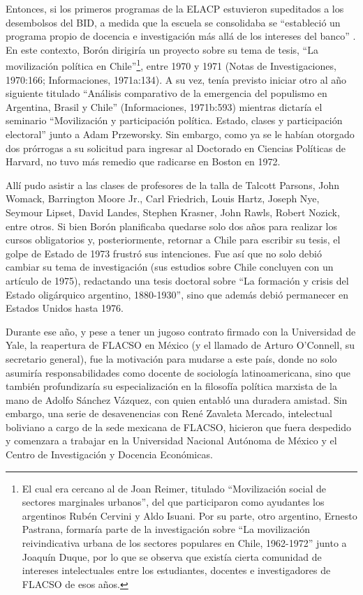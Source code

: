 Entonces, si los primeros programas de la ELACP estuvieron supeditados a los desembolsos del BID, a medida que la escuela se consolidaba se \enquote{estableció un programa propio de docencia e investigación más allá de los intereses del banco} \parencite[83]{1515-ABARZUACUTRONI2014}. En este contexto, Borón dirigiría un proyecto sobre su tema de tesis, \enquote{La movilización política en Chile}\footnote{El cual era cercano al de Joan Reimer, titulado \enquote{Movilización social de sectores marginales urbanos}, del que participaron como ayudantes los argentinos Rubén Cervini y Aldo Isuani. Por su parte, otro argentino, Ernesto Pastrana, formaría parte de la investigación sobre \enquote{La movilización reivindicativa urbana de los sectores populares en Chile, 1962-1972} junto a Joaquín Duque, por lo que se observa que existía cierta comunidad de intereses intelectuales entre los estudiantes, docentes e investigadores de FLACSO de esos años.}, entre 1970 y 1971 (Notas de Investigaciones, 1970:166; Informaciones, 1971a:134). A su vez, tenía previsto iniciar otro al año siguiente titulado \enquote{Análisis comparativo de la emergencia del populismo en Argentina, Brasil y Chile} (Informaciones, 1971b:593) mientras dictaría el seminario \enquote{Movilización y participación política. Estado, clases y participación electoral} junto a Adam Przeworsky. Sin embargo, como ya se le habían otorgado dos prórrogas a su solicitud para ingresar al Doctorado en Ciencias Políticas de Harvard, no tuvo más remedio que radicarse en Boston en 1972.

Allí pudo asistir a las clases de profesores de la talla de Talcott Parsons, John Womack, Barrington Moore Jr., Carl Friedrich, Louis Hartz, Joseph Nye, Seymour Lipset, David Landes, Stephen Krasner, John Rawls, Robert Nozick, entre otros. Si bien Borón planificaba quedarse solo dos años para realizar los cursos obligatorios y, posteriormente, retornar a Chile para escribir su tesis, el golpe de Estado de 1973 frustró sus intenciones. Fue así que no solo debió cambiar su tema de investigación (sus estudios sobre Chile concluyen con un artículo de 1975), redactando una tesis doctoral sobre \enquote{La formación y crisis del Estado oligárquico argentino, 1880-1930}, sino que además debió permanecer en Estados Unidos hasta 1976.

Durante ese año, y pese a tener un jugoso contrato firmado con la Universidad de Yale, la reapertura de FLACSO en México (y el llamado de Arturo O'Connell, su secretario general), fue la motivación para mudarse a este país, donde no solo asumiría responsabilidades como docente de sociología latinoamericana, sino que también profundizaría su especialización en la filosofía política marxista de la mano de Adolfo Sánchez Vázquez, con quien entabló una duradera amistad. Sin embargo, una serie de desavenencias con René Zavaleta Mercado, intelectual boliviano a cargo de la sede mexicana de FLACSO, hicieron que fuera despedido y comenzara a trabajar en la Universidad Nacional Autónoma de México y el Centro de Investigación y Docencia Económicas.

